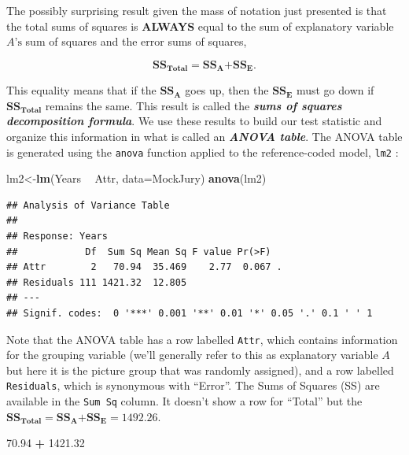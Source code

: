 \documentclass[]{book}
\newenvironment{Shaded}{\begin{snugshade}}{\end{snugshade}}
\newcommand{\KeywordTok}[1]{\textcolor[rgb]{0.13,0.29,0.53}{\textbf{#1}}}
\newcommand{\DataTypeTok}[1]{\textcolor[rgb]{0.13,0.29,0.53}{#1}}
\newcommand{\FloatTok}[1]{\textcolor[rgb]{0.00,0.00,0.81}{#1}}
\newcommand{\StringTok}[1]{\textcolor[rgb]{0.31,0.60,0.02}{#1}}
\newcommand{\OperatorTok}[1]{\textcolor[rgb]{0.81,0.36,0.00}{\textbf{#1}}}
\newcommand{\NormalTok}[1]{#1}
\begin{document}
The possibly surprising result given the mass of notation just presented
is that the total sums of squares is \textbf{ALWAYS} equal to the sum of
explanatory variable \(A\text{'s}\) sum of squares and the error sums of
squares,

\[\textbf{SS}_{\textbf{Total}} \mathbf{=} \textbf{SS}_\textbf{A} \mathbf{+} \textbf{SS}_\textbf{E}.\]

This equality means that if the \(\textbf{SS}_\textbf{A}\) goes up, then
the \(\textbf{SS}_\textbf{E}\) must go down if
\(\textbf{SS}_{\textbf{Total}}\) remains the same. This result is called
the \textbf{\emph{sums of squares decomposition formula}}. We use these
results to build our test statistic and organize this information in
what is called an \textbf{\emph{ANOVA table}}. The ANOVA table is
generated using the \texttt{anova} function applied to the
reference-coded model, \texttt{lm2} :

\begin{Shaded}
\begin{Highlighting}[]
\NormalTok{lm2<-}\KeywordTok{lm}\NormalTok{(Years }\OperatorTok{~}\StringTok{ }\NormalTok{Attr, }\DataTypeTok{data=}\NormalTok{MockJury)}
\KeywordTok{anova}\NormalTok{(lm2)}
\end{Highlighting}
\end{Shaded}

\begin{verbatim}
## Analysis of Variance Table
## 
## Response: Years
##            Df  Sum Sq Mean Sq F value Pr(>F)  
## Attr        2   70.94  35.469    2.77  0.067 .
## Residuals 111 1421.32  12.805                 
## ---
## Signif. codes:  0 '***' 0.001 '**' 0.01 '*' 0.05 '.' 0.1 ' ' 1
\end{verbatim}

Note that the ANOVA table has a row labelled \texttt{Attr}, which
contains information for the grouping variable (we'll generally refer to
this as explanatory variable \(A\) but here it is the picture group that
was randomly assigned), and a row labelled \texttt{Residuals}, which is
synonymous with ``Error''. The Sums of Squares (SS) are available in the
\texttt{Sum\ Sq} column. It doesn't show a row for ``Total'' but the
\(\textbf{SS}_{\textbf{Total}} \mathbf{=} \textbf{SS}_\textbf{A} \mathbf{+} \textbf{SS}_\textbf{E} = 1492.26\).

\begin{Shaded}
\begin{Highlighting}[]
\FloatTok{70.94} \OperatorTok{+}\StringTok{ }\FloatTok{1421.32}
\end{Highlighting}
\end{Shaded}
\end{document}
